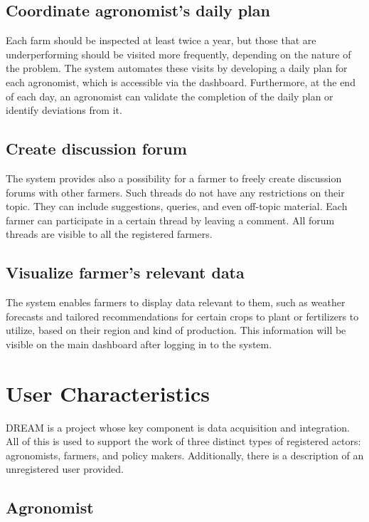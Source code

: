 \subsection{Coordinate agronomist's daily plan}

Each farm should be inspected at least twice a year, but those that are underperforming should be visited more frequently, depending on the nature of the problem. The system automates these visits by developing a daily plan for each agronomist, which is accessible via the dashboard. Furthermore, at the end of each day, an agronomist can validate the completion of the daily plan or identify deviations from it.

\subsection{Create discussion forum}

The system provides also a possibility for a farmer to freely create discussion forums with other farmers. Such threads do not have any restrictions on their topic. They can include suggestions, queries, and even off-topic material. Each farmer can participate in a certain thread by leaving a comment. All forum threads are visible to all the registered farmers.

\subsection{Visualize farmer's relevant data}

The system enables farmers to display data relevant to them, such as weather forecasts and tailored recommendations for certain crops to plant or fertilizers to utilize, based on their region and kind of production. This information will be visible on the main dashboard after logging in to the system.

\section{User Characteristics} \label{sec:user_characteristics}

DREAM is a project whose key component is data acquisition and integration. All of this is used to support the work of three distinct types of registered actors: agronomists, farmers, and policy makers. Additionally, there is a description of an unregistered user provided.

\subsection{Agronomist} \label{subsec:agronomist}

